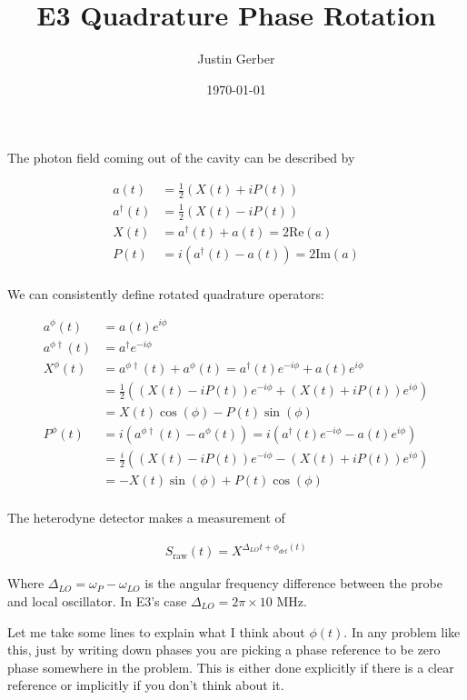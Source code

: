 \documentclass[12pt]{article}
\begin{document}
\title{E3 Quadrature Phase Rotation}
\author{Justin Gerber}
\date{\today}
\maketitle

The photon field coming out of the cavity can be described by

\begin{align}
a(t) &= \frac{1}{2}(X(t) + i P(t))\\
a^{\dag}(t) &= \frac{1}{2}(X(t) - i P(t))\\
X(t) &= a^{\dag}(t) + a(t) = 2\text{Re}(a)\\
P(t) &= i(a^{\dag}(t) - a(t)) = 2\text{Im}(a)\\
\end{align}

We can consistently define rotated quadrature operators:

\begin{align}
a^{\phi}(t) &= a(t)e^{i\phi}\\
a^{\phi \dag}(t) &= a^{\dag}e^{-i\phi}\\
X^{\phi}(t) &= a^{\phi \dag}(t) + a^{\phi}(t) = a^{\dag}(t)e^{-i\phi} + a(t) e^{i\phi}\\
&= \frac{1}{2}\left((X(t)-iP(t))e^{-i\phi} + (X(t) + iP(t))e^{i\phi} \right)\\
&= X(t) \cos(\phi) - P(t) \sin(\phi)\\
P^{\phi}(t) &= i(a^{\phi \dag}(t) - a^{\phi}(t)) = i(a^{\dag}(t)e^{-i\phi} - a(t) e^{i\phi}) \\
&= \frac{i}{2}\left((X(t)-iP(t))e^{-i\phi} - (X(t) + iP(t))e^{i\phi} \right)\\
&= -X(t) \sin(\phi) + P(t) \cos(\phi)\\
\end{align}

The heterodyne detector makes a measurement of

\begin{align}
S_{\text{raw}}(t) = X^{\Delta_{LO} t + \phi_{det}(t)}
\end{align}

Where $\Delta_{LO} = \omega_P - \omega_{LO}$ is the angular frequency difference between the probe and local oscillator. In E3's case $\Delta_{LO} = 2\pi \times 10 \text{ MHz}$.

Let me take some lines to explain what I think about $\phi(t)$. In any problem like this, just by writing down phases you are picking a phase reference to be zero phase somewhere in the problem. This is either done explicitly if there is a clear reference or implicitly if you don't think about it.
\end{document}
